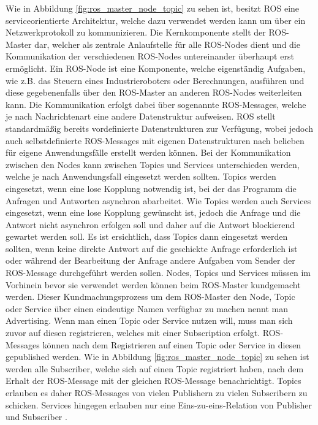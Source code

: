 Wie in Abbildung \ref{fig:ros_master_node_topic} zu sehen ist, besitzt ROS eine serviceorientierte Architektur, welche dazu verwendet werden kann um über ein Netzwerkprotokoll zu kommunizieren. Die Kernkomponente stellt der ROS-Master dar, welcher als zentrale Anlaufstelle für alle ROS-Nodes dient und die Kommunikation der verschiedenen ROS-Nodes untereinander überhaupt erst ermöglicht. Ein ROS-Node ist eine Komponente, welche eigenständig Aufgaben, wie z.B. das Steuern eines Industrieroboters oder Berechnungen, ausführen und diese gegebenenfalls über den ROS-Master an anderen ROS-Nodes weiterleiten kann. Die Kommunikation erfolgt dabei über sogenannte ROS-Messages, welche je nach Nachrichtenart eine andere Datenstruktur aufweisen. ROS stellt standardmäßig bereits vordefinierte Datenstrukturen zur Verfügung, wobei jedoch auch selbstdefinierte ROS-Messages mit eigenen Datenstrukturen nach belieben für eigene Anwendungsfälle erstellt werden können. Bei der Kommunikation zwischen den Nodes kann zwischen Topics und Services unterschieden werden, welche je nach Anwendungsfall eingesetzt werden sollten. Topics werden eingesetzt, wenn eine lose Kopplung notwendig ist, bei der das Programm die Anfragen und Antworten asynchron abarbeitet. Wie Topics werden auch Services eingesetzt, wenn eine lose Kopplung gewünscht ist, jedoch die Anfrage und die Antwort nicht asynchron erfolgen soll und daher auf die Antwort blockierend gewartet werden soll. Es ist ersichtlich, dass Topics dann eingesetzt werden sollten, wenn keine direkte Antwort auf die geschickte Anfrage erforderlich ist oder während der Bearbeitung der Anfrage andere Aufgaben vom Sender der ROS-Message durchgeführt werden sollen. Nodes, Topics und Services müssen im Vorhinein bevor sie verwendet werden können beim ROS-Master kundgemacht werden. Dieser Kundmachungsprozess um dem ROS-Master den Node, Topic oder Service über einen eindeutige Namen verfügbar zu machen nennt man Advertising. Wenn man einen Topic oder Service nutzen will, muss man sich zuvor auf diesen registrieren, welches mit einer Subscription erfolgt. ROS-Messages können nach dem Registrieren auf einen Topic oder Service in diesen gepublished werden. Wie in Abbildung \ref{fig:ros_master_node_topic} zu sehen ist werden alle Subscriber, welche sich auf einen Topic registriert haben, nach dem Erhalt der ROS-Message mit der gleichen ROS-Message benachrichtigt. Topics erlauben es daher ROS-Messages von vielen Publishern zu vielen Subscribern zu schicken. Services hingegen erlauben nur eine Eins-zu-eins-Relation von Publisher und Subscriber \cite{noauthor_rosconcepts_nodate}.

